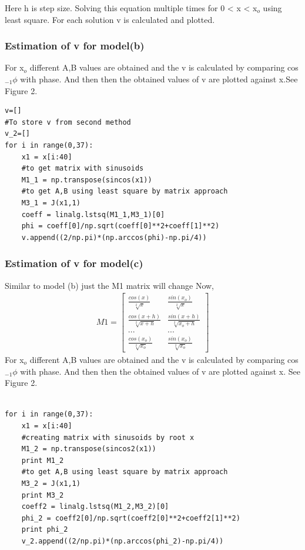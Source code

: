 \documentclass[a4paper]{article}
\begin{document}
Here h is step size. Solving this equation multiple times for 0 < x < x$_{o}$ using least square. For each solution v is calculated and plotted. 
\subsubsection{Estimation of v for model(b)}
For x$_{o}$ different A,B values are obtained and the v is calculated by comparing cos$_{-1}\phi$ with phase. And then then the obtained values of v are plotted against x.See Figure 2.
\begin{lstlisting}
v=[]
#To store v from second method
v_2=[]
for i in range(0,37):
	x1 = x[i:40]
	#to get matrix with sinusoids 
	M1_1 = np.transpose(sincos(x1))
	#to get A,B using least square by matrix approach	
	M3_1 = J(x1,1)
	coeff = linalg.lstsq(M1_1,M3_1)[0]
	phi = coeff[0]/np.sqrt(coeff[0]**2+coeff[1]**2)
	v.append((2/np.pi)*(np.arccos(phi)-np.pi/4))

\end{lstlisting}

\subsubsection{Estimation of v for model(c)}
Similar to model (b) just the M1 matrix will change Now,
\begin{gather}
M1 = 
\begin{bmatrix} \frac{cos(x)}{\sqrt[2]{x}} & \frac{sin(x_{o})}{\sqrt[2]{x}} \\  \frac{cos(x+h)}{\sqrt[2]{x+h}} & \frac{sin(x+h)}{\sqrt[2]{x_{o}+h}}  \\ ... & ... \\\frac{cos(x_{o})}{\sqrt[2]{x_{o}}} & \frac{sin(x_{o})}{\sqrt[2]{x_{o}}} \end{bmatrix}
\end{gather}
 For x$_{o}$ different A,B values are obtained and the v is calculated by comparing cos$_{-1}\phi$ with phase. And then then the obtained values of v are plotted against x. See Figure 2.
\pagebreak
\begin{lstlisting}

for i in range(0,37):
	x1 = x[i:40]
	#creating matrix with sinusoids by root x 
	M1_2 = np.transpose(sincos2(x1))
	print M1_2
	#to get A,B using least square by matrix approach
	M3_2 = J(x1,1)
	print M3_2
	coeff2 = linalg.lstsq(M1_2,M3_2)[0]
	phi_2 = coeff2[0]/np.sqrt(coeff2[0]**2+coeff2[1]**2)
	print phi_2
	v_2.append((2/np.pi)*(np.arccos(phi_2)-np.pi/4))

\end{lstlisting}
\end{document}
